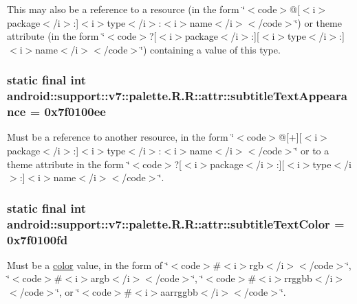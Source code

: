 This may also be a reference to a resource (in the form \char`\"{}$<$code$>$@\mbox{[}$<$i$>$package$<$/i$>$:\mbox{]}$<$i$>$type$<$/i$>$:$<$i$>$name$<$/i$>$$<$/code$>$\char`\"{}) or theme attribute (in the form \char`\"{}$<$code$>$?\mbox{[}$<$i$>$package$<$/i$>$:\mbox{]}\mbox{[}$<$i$>$type$<$/i$>$:\mbox{]}$<$i$>$name$<$/i$>$$<$/code$>$\char`\"{}) containing a value of this type. \hypertarget{classandroid_1_1support_1_1v7_1_1palette_1_1_r_1_1attr_3c41075084d4d7fc04e24f552a0cac50}{
\subsubsection[{subtitleTextAppearance}]{\setlength{\rightskip}{0pt plus 5cm}static final int android::support::v7::palette.R.R::attr::subtitleTextAppearance = 0x7f0100ee}}
\label{classandroid_1_1support_1_1v7_1_1palette_1_1_r_1_1attr_3c41075084d4d7fc04e24f552a0cac50}


Must be a reference to another resource, in the form \char`\"{}$<$code$>$@\mbox{[}+\mbox{]}\mbox{[}$<$i$>$package$<$/i$>$:\mbox{]}$<$i$>$type$<$/i$>$:$<$i$>$name$<$/i$>$$<$/code$>$\char`\"{} or to a theme attribute in the form \char`\"{}$<$code$>$?\mbox{[}$<$i$>$package$<$/i$>$:\mbox{]}\mbox{[}$<$i$>$type$<$/i$>$:\mbox{]}$<$i$>$name$<$/i$>$$<$/code$>$\char`\"{}. \hypertarget{classandroid_1_1support_1_1v7_1_1palette_1_1_r_1_1attr_7df0f069537398339929710286feb817}{
\subsubsection[{subtitleTextColor}]{\setlength{\rightskip}{0pt plus 5cm}static final int android::support::v7::palette.R.R::attr::subtitleTextColor = 0x7f0100fd}}
\label{classandroid_1_1support_1_1v7_1_1palette_1_1_r_1_1attr_7df0f069537398339929710286feb817}


Must be a \hyperlink{classandroid_1_1support_1_1v7_1_1palette_1_1_r_1_1color}{color} value, in the form of \char`\"{}$<$code$>$\#$<$i$>$rgb$<$/i$>$$<$/code$>$\char`\"{}, \char`\"{}$<$code$>$\#$<$i$>$argb$<$/i$>$$<$/code$>$\char`\"{}, \char`\"{}$<$code$>$\#$<$i$>$rrggbb$<$/i$>$$<$/code$>$\char`\"{}, or \char`\"{}$<$code$>$\#$<$i$>$aarrggbb$<$/i$>$$<$/code$>$\char`\"{}. 

